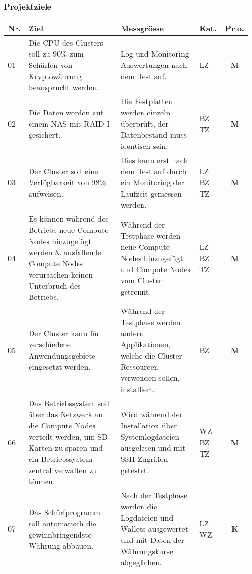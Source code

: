 \newpage
\subsubsection{Projektziele} 
\label{sec:Projektziele}

\begin{table}[H]
\begin{tabular}[t]{p{0.7cm}|p{6.1cm}p{6.1cm} >{\centering}p{0.6cm}c}
\hline
\rowcolor{heading}\textbf{Nr.} & \textbf{Ziel} & \textbf{Messgrösse} & \textbf{Kat.} & \textbf{Prio.} \\\hline
01 & Die CPU des Clusters soll zu 90\% zum Schürfen von Kryptowährung  beansprucht werden. & Log und Monitoring Auswertungen nach dem Testlauf. & LZ & \textbf{M} \\\hline
02 & Die Daten werden auf einem NAS mit RAID I gesichert. & Die Festplatten werden einzeln überprüft, der Datenbestand muss identisch sein. & BZ \newline TZ & \textbf{M} \\\hline
03 & Der Cluster soll eine Verfügbarkeit von 98\% aufweisen. & Dies kann erst nach dem Testlauf durch ein Monitoring der Laufzeit gemessen werden. & LZ \newline BZ \newline TZ & \textbf{M} \\\hline
04 & Es können während des Betriebs neue Compute Nodes hinzugefügt werden \& ausfallende Compute Nodes verursachen keinen Unterbruch des Betriebs. & Während der Testphase werden neue Compute Nodes hinzugefügt und Compute Nodes vom Cluster getrennt.  & LZ \newline BZ \newline TZ & \textbf{M} \\\hline 
05 & Der Cluster kann für verschiedene Anwendungsgebiete eingesetzt werden. & Während der Testphase werden andere Applikationen, welche die Cluster Ressourcen verwenden sollen, installiert. & BZ & \textbf{M} \\\hline
06 & Das Betriebssystem soll über das Netzwerk an die Compute Nodes verteilt werden, um SD-Karten zu sparen und ein Betriebssystem zentral verwalten zu können. & Wird während der Installation über Systemlogdateien ausgelesen und mit SSH-Zugriffen getestet. & WZ \newline BZ \newline TZ & \textbf{M} \\\hline
07 & Das Schürfprogramm soll automatisch die gewinnbringendste Währung abbauen. & Nach der Testphase werden die Logdateien und Wallets ausgewertet und mit Daten der Währungskurse abgeglichen. & LZ \newline WZ & \textbf{K} \\\hline

\end{tabular}
\end{table}
